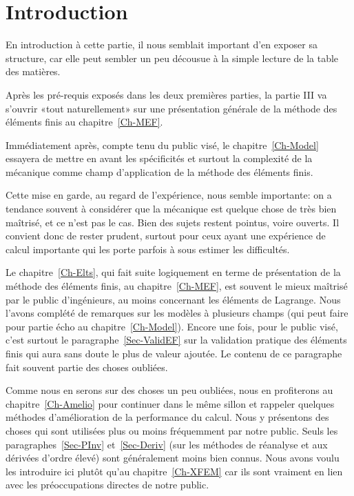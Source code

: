\chapter*{Introduction}
En introduction à cette partie, il nous semblait important d'en exposer sa structure, car elle peut sembler un peu décousue à la simple lecture de la table des matières.

\medskip
Après les pré-requis exposés dans les deux premières parties, la partie III va s'ouvrir «tout naturellement» sur une présentation générale de la méthode des éléments finis au chapitre~\ref{Ch-MEF}.

\medskip
Immédiatement après, compte tenu du public visé, le chapitre~\ref{Ch-Model} essayera de mettre en avant les spécificités et surtout la complexité de la mécanique comme champ d'application de la méthode des éléments finis.

Cette mise en garde, au regard de l'expérience, nous semble importante: on a tendance souvent à considérer que la mécanique est quelque chose de très bien maîtrisé, et ce n'est pas le cas. Bien des sujets restent pointus, voire ouverts. Il convient donc de rester prudent, surtout pour ceux ayant une expérience de calcul importante qui les porte parfois à sous estimer les difficultés.

\medskip
Le chapitre~\ref{Ch-Elts}, qui fait suite logiquement en terme de présentation de la méthode des éléments finis, au chapitre~\ref{Ch-MEF}, est souvent le mieux maîtrisé par le public d'ingénieurs, au moins concernant les éléments de Lagrange.
Nous l'avons complété de remarques sur les modèles à plusieurs champs (qui peut faire pour partie écho au chapitre~\ref{Ch-Model}).
Encore une fois, pour le public visé, c'est surtout le paragraphe~\ref{Sec-ValidEF} sur la validation pratique des éléments finis qui aura sans doute le plus de valeur ajoutée. Le contenu de ce paragraphe fait souvent partie des choses oubliées.

\medskip
Comme nous en serons sur des choses un peu oubliées, nous en profiterons au chapitre~\ref{Ch-Amelio} pour continuer dans le même sillon et rappeler quelques méthodes d'amélioration de la performance du calcul. Nous y présentons des choses qui sont utilisées plus ou moins fréquemment par notre public.
Seuls les paragraphes~\ref{Sec-PInv} et~\ref{Sec-Deriv} (sur les méthodes de réanalyse et aux dérivées d'ordre élevé) sont généralement moins bien connus. Nous avons voulu les introduire ici plutôt qu'au chapitre~\ref{Ch-XFEM} car ils sont vraiment en lien avec les préoccupations directes de notre public.

